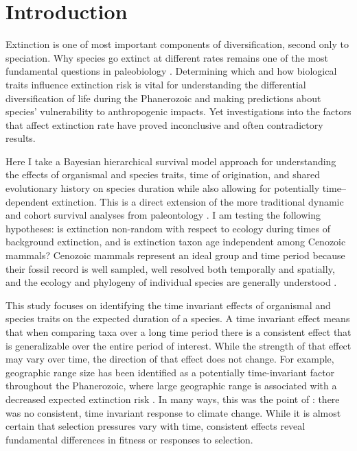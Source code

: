\documentclass[12pt,letterpaper]{article}
\begin{document}
\section{Introduction}

Extinction is one of most important components of diversification, second only to speciation. Why species go extinct at different rates remains one of the most fundamental questions in paleobiology \citep{Simpson1944,VanValen1973,Raup1991b,Raup1994,Quental2013,Wagner2014b,Jablonski2005,Payne2007,Kitchell1986}. Determining which and how biological traits influence extinction risk is vital for understanding the differential diversification of life during the Phanerozoic and making predictions about species' vulnerability to anthropogenic impacts. Yet investigations into the factors that affect extinction rate have proved inconclusive and often contradictory results. 

Here I take a Bayesian hierarchical survival model approach for understanding the effects of organismal and species traits, time of origination, and shared evolutionary history on species duration while also allowing for potentially time--dependent extinction. This is a direct extension of the more traditional dynamic and cohort survival analyses from paleontology \citep{Simpson1944,VanValen1973,Foote1988,Raup1978,Raup1975,VanValen1979,Baumiller1993,Sepkoski1975}. I am testing the following hypotheses: is extinction non-random with respect to ecology during times of background extinction, and is extinction taxon age independent among Cenozoic mammals? Cenozoic mammals represent an ideal group and time period because their fossil record is well sampled, well resolved both temporally and spatially, and the ecology and phylogeny of individual species are generally understood \citep{Alroy2009,Alroy2000g,Jernvall2002,Liow2008,Smith2004,Quental2013,Alroy1996a,Alroy1998,Simpson1944,Blois2009,Tomiya2013,Marcot2014}. 

This study focuses on identifying the time invariant effects of organismal and species traits on the expected duration of a species. A time invariant effect means that when comparing taxa over a long time period there is a consistent effect that is generalizable over the entire period of interest. While the strength of that effect may vary over time, the direction of that effect does not change. For example, geographic range size has been identified as a potentially time-invariant factor throughout the Phanerozoic, where large geographic range is associated with a decreased expected extinction risk \citep{Payne2007}.  In many ways, this was the point of \citet{Alroy2000g}: there was no consistent, time invariant response to climate change. While it is almost certain that selection pressures vary with time, consistent effects reveal fundamental differences in fitness or responses to selection. %
\end{document}
